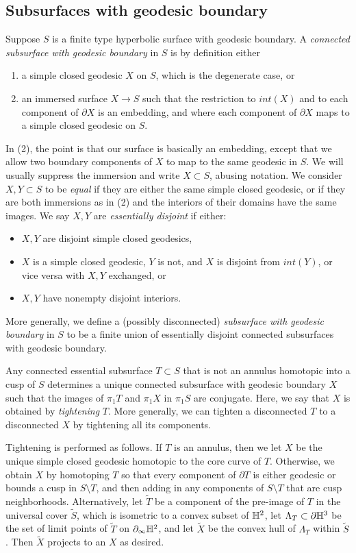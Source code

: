 \documentclass[12pt]{amsart}
\theoremstyle{definition}
\theoremstyle{remark}
\begin{document}
\subsection{Subsurfaces with geodesic boundary}
\label{subsurfacessec}
Suppose $S $ is a  finite type hyperbolic surface with geodesic boundary. A \emph{connected subsurface with geodesic boundary} in $S$ is by definition either
\begin{enumerate}
	\item a simple closed geodesic $X$ on $S$, which is the degenerate case, or 
	\item an immersed surface $X\longrightarrow S$ such that the restriction to $int(X)$ and to each component of $\partial X$ is an embedding, and where each component of $\partial X$ maps to a simple closed geodesic on $S $.
\end{enumerate} 
In (2), the point is that our surface is basically an embedding, except that we allow two boundary components of $X$ to map to the same geodesic in $S$. We will usually suppress the immersion and write $X \subset S$, abusing notation. We consider  $X,Y\subset S$ to be \emph{equal} if they are either the same simple closed geodesic, or if they are both immersions as in (2) and the interiors of their domains have the same images. We say $X,Y$ are \emph{essentially disjoint} if either:
\begin{itemize}
\item $X,Y$ are disjoint simple closed geodesics, 
\item $X$ is a simple closed geodesic, $Y$ is not, and $X$ is disjoint from $int(Y)$, or vice versa with $X,Y$ exchanged, or
\item $X,Y$ have nonempty disjoint interiors.
\end{itemize} 
More generally, we define a (possibly disconnected) \emph{subsurface with geodesic boundary} in $S$ to be a finite union of essentially disjoint connected subsurfaces with geodesic boundary.

\medskip

Any connected essential subsurface $T \subset S $ that is not an annulus homotopic into a cusp of $S$ determines a unique connected subsurface with geodesic boundary $X$ such that the images of $\pi_1 T$ and $\pi_1 X$ in $\pi_1 S$ are conjugate. Here, we say that $X$ is obtained by \emph{tightening} $T$. More generally, we can tighten a  disconnected $T$ to a disconnected $X$ by tightening all its components. 

Tightening is performed as follows. If $T$ is an annulus, then we let $X$ be the unique simple closed geodesic homotopic to the core curve of $T$. Otherwise, we obtain $X$ by homotoping $T$ so that every component of $\partial T$ is either geodesic or bounds a cusp in $S \setminus T$, and then adding in any components of $S \setminus T$ that are cusp neighborhoods.
 Alternatively, let $\tilde T$ be a component of the pre-image of $T$ in the universal cover $\tilde S$, which is isometric to a convex subset of $\mathbb H^2$, let $\Lambda_T \subset \partial \mathbb H^3$ be the set of limit points of $\tilde T$ on $\partial_\infty \mathbb H^2$, and let $\tilde X$ be the convex hull of $\Lambda_T$ within $\tilde S$. Then $\tilde X$ projects to an $X$ as desired.
\end{document}
